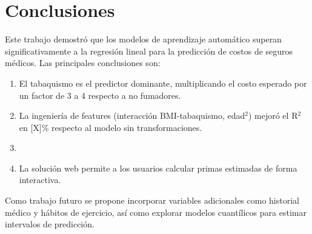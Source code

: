 \section{Conclusiones}

Este trabajo demostró que los modelos de aprendizaje automático superan
significativamente a la regresión lineal para la predicción de costos
de seguros médicos. Las principales conclusiones son:

\begin{enumerate}
  \item El tabaquismo es el predictor dominante, multiplicando el costo
        esperado por un factor de 3 a 4 respecto a no fumadores.
  \item La ingeniería de features (interacción BMI-tabaquismo, edad$^2$)
        mejoró el R$^2$ en [X]\% respecto al modelo sin transformaciones.
  \item [Completar con resultado específico del mejor modelo]
  \item La solución web permite a los usuarios calcular primas estimadas
        de forma interactiva.
\end{enumerate}

Como trabajo futuro se propone incorporar variables adicionales como
historial médico y hábitos de ejercicio, así como explorar modelos
cuantílicos para estimar intervalos de predicción.
